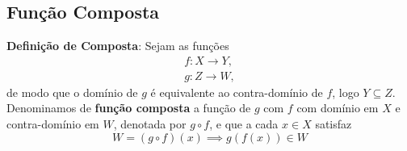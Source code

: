 \documentclass[13pt,letterpaper]{article}
\begin{document}
\subsection{Função Composta}
\textbf{Definição de Composta}: Sejam as funções 
\begin{align*}
    f: X \rightarrow Y, \\
    g: Z \rightarrow W,
\end{align*}
de modo que o domínio de $g$ é equivalente ao contra-domínio de $f$, logo $Y \subseteq Z$. Denominamos de \textbf{função composta} a função de $g$ com $f$ com domínio em $X$ e contra-domínio em $W$, denotada por $g \circ f$, e que a cada $x \in X$ satisfaz 
\begin{displaymath}
    W = (g \circ f) (x) \implies g(f(x)) \in W
\end{displaymath} \\
\end{document}
